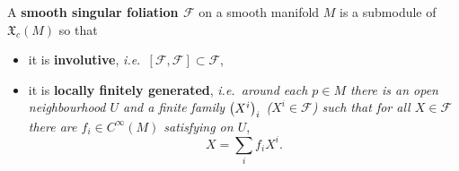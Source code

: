 \documentclass[
aspectratio=3218, 
10pt
]{beamer}
\def\bes{\begin{equation*}}
\def\ees{\end{equation*}}
\theoremstyle{plain}
\theoremstyle{remark}
\begin{document}
\begin{frame}
\begin{definition}\vspace{.5pt}
A \textbf{smooth singular foliation $\mathcal{F}$} on a smooth manifold $M$ is a submodule of $\mathfrak{X}_c(M)$ so that
\begin{itemize}
	\item it is \textbf{involutive}, \textit{i.e.\ $[\mathcal{F}, \mathcal{F}] \subset \mathcal{F}$},
	\item it is \textbf{locally finitely generated}, \textit{i.e.\ around each $p \in M$ there is an open neighbourhood $U$ and a finite family $\mleft( X^i \mright)_i$ ($X^i \in \mathcal{F}$) such that for all $X \in \mathcal{F}$ there are $f_i \in C^\infty(M)$ satisfying on $U$},
	\bes
	X = \sum_i f_i X^i.
	\ees
\end{itemize}
\end{definition}
\end{frame}

%
%
%
%

%
\end{document}
